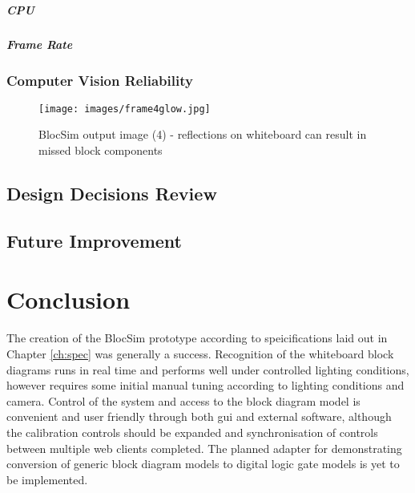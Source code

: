 \paragraph{CPU}



\paragraph{Frame Rate}



\subsection{Computer Vision Reliability}

\begin{figure}[ht!]
\centering
\texttt{[image: images/frame4glow.jpg]}
\caption{BlocSim output image (4) - reflections on whiteboard can result in missed block components}
\label{im:frame4glow}
\end{figure}


\section{Design Decisions Review}



\section{Future Improvement}




\chapter{Conclusion}

The creation of the BlocSim prototype according to speicifications laid out in Chapter \ref{ch:spec} was generally a success. Recognition of the whiteboard block diagrams runs in real time and performs well under controlled lighting conditions, however requires some initial manual tuning according to lighting conditions and camera. Control of the system and access to the block diagram model is convenient and user friendly through both \gls{gui} and external software, although the calibration controls should be expanded and synchronisation of controls between multiple web clients completed. The planned adapter for demonstrating conversion of generic block diagram models to digital logic gate models is yet to be implemented.
\\


